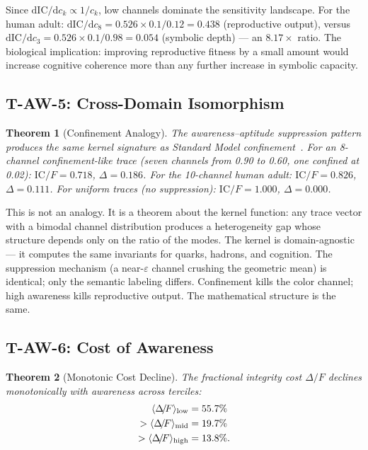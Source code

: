 \documentclass[
  aps,
  prd,
  twocolumn,
  superscriptaddress,
  nofootinbib,
  floatfix
]{revtex4-2}
\newtheorem{theorem}{Theorem}
\newcommand{\eps}{\varepsilon}
\newcommand{\dd}{\mathrm{d}}
\newcommand{\IC}{\mathrm{IC}}
\newcommand{\DeltaF}{\Delta\!/\!F}
\begin{document}
Since $\dd\IC/\dd c_k \propto 1/c_k$, low channels dominate
the sensitivity landscape.  For the human adult:
$\dd\IC/\dd c_{8} = 0.526 \times 0.1/0.12 = 0.438$
(reproductive output), versus
$\dd\IC/\dd c_{3} = 0.526 \times 0.1/0.98 = 0.054$
(symbolic depth) --- an $8.17\!\times$ ratio.  The
biological implication: improving reproductive fitness by
a small amount would increase cognitive coherence more than
any further increase in symbolic capacity.

\subsection{T-AW-5: Cross-Domain Isomorphism}

\begin{theorem}[Confinement Analogy]\label{thm:TAW5}
The awareness--aptitude suppression pattern produces the same
kernel signature as Standard Model
confinement~\cite{paulus2026sm,wilson1974confinement}.
For an 8-channel confinement-like trace (seven channels from
0.90 to 0.60, one confined at 0.02):
$\IC/F = 0.718$, $\Delta = 0.186$.
For the 10-channel human adult:
$\IC/F = 0.826$, $\Delta = 0.111$.
For uniform traces (no suppression):
$\IC/F = 1.000$, $\Delta = 0.000$.
\end{theorem}

This is not an analogy.  It is a theorem about the kernel
function: any trace vector with a bimodal channel distribution
produces a heterogeneity gap whose structure depends only on
the ratio of the modes.  The kernel is domain-agnostic ---
it computes the same invariants for quarks, hadrons, and
cognition.  The suppression mechanism (a near-$\eps$ channel
crushing the geometric mean) is identical; only the semantic
labeling differs.  Confinement kills the color channel;
high awareness kills reproductive output.  The mathematical
structure is the same.

\subsection{T-AW-6: Cost of Awareness}

\begin{theorem}[Monotonic Cost Decline]\label{thm:TAW6}
The fractional integrity cost $\DeltaF$ declines
monotonically with awareness across terciles:
\begin{align}
  \langle\DeltaF\rangle_{\mathrm{low}} &= 55.7\% \notag\\
  > \langle\DeltaF\rangle_{\mathrm{mid}} &= 19.7\% \notag\\
  > \langle\DeltaF\rangle_{\mathrm{high}} &= 13.8\%.
\end{align}
\end{theorem}
\end{document}
